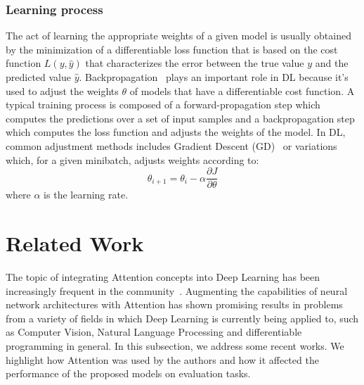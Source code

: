 \documentclass[12pt]{article}
\begin{document}
\subsubsection{Learning process}
The act of learning the appropriate weights of a given model
is usually obtained by the minimization of a differentiable loss function
that is based on the cost function $L(y, \hat{y})$ that characterizes the error
between the true value $y$ and the predicted value $\hat{y}$.
Backpropagation~\cite{ref:backprop} plays an important role in DL because it's used
to adjust the weights $\theta$ of models that have a
differentiable cost function.
A typical training process is composed of a forward-propagation
step which computes the predictions over a set of input samples
and a backpropagation step which computes the loss function
and adjusts the weights of the model.
In DL, common adjustment methods includes Gradient Descent (GD)~\cite{ref:gd} or variations
which, for a given minibatch, adjusts weights according to:
$$\theta_{i+1} = \theta_i - \alpha\frac{\partial{J}}{\partial{\theta}}$$
where $\alpha$ is the learning rate.

\let\clearpage\relax

\newpage
\section{Related Work} \label{sess:related-work}
The topic of integrating Attention concepts into Deep Learning has been increasingly frequent
in the community~\cite{ref:att-survey}.
Augmenting the capabilities of neural network architectures with Attention has shown promising results
in problems from a variety of fields in which Deep Learning is currently being applied to, such as
Computer Vision, Natural Language Processing and differentiable programming in general.
In this subsection, we address some recent works.
We highlight how Attention was used by the authors and how it affected the performance of the proposed models
on evaluation tasks.
\end{document}
